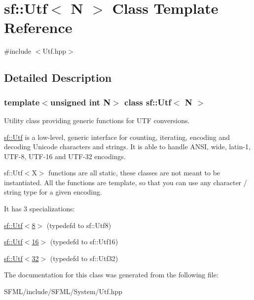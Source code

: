 \hypertarget{classsf_1_1_utf}{}\section{sf\+:\+:Utf$<$ N $>$ Class Template Reference}
\label{classsf_1_1_utf}


{\ttfamily \#include $<$Utf.\+hpp$>$}



\subsection{Detailed Description}
\subsubsection*{template$<$unsigned int N$>$\newline
class sf\+::\+Utf$<$ N $>$}

Utility class providing generic functions for U\+TF conversions.

\mbox{\hyperlink{classsf_1_1_utf}{sf\+::\+Utf}} is a low-\/level, generic interface for counting, iterating, encoding and decoding Unicode characters and strings. It is able to handle A\+N\+SI, wide, latin-\/1, U\+T\+F-\/8, U\+T\+F-\/16 and U\+T\+F-\/32 encodings.

sf\+::\+Utf$<$\+X$>$ functions are all static, these classes are not meant to be instantiated. All the functions are template, so that you can use any character / string type for a given encoding.

It has 3 specializations\+: \begin{DoxyItemize}
\item \mbox{\hyperlink{classsf_1_1_utf_3_018_01_4}{sf\+::\+Utf$<$8$>$}} (typedef\textquotesingle{}d to sf\+::\+Utf8) \item \mbox{\hyperlink{classsf_1_1_utf_3_0116_01_4}{sf\+::\+Utf$<$16$>$}} (typedef\textquotesingle{}d to sf\+::\+Utf16) \item \mbox{\hyperlink{classsf_1_1_utf_3_0132_01_4}{sf\+::\+Utf$<$32$>$}} (typedef\textquotesingle{}d to sf\+::\+Utf32) \begin{DoxyVerb}\end{DoxyVerb}
 \end{DoxyItemize}


The documentation for this class was generated from the following file\+:\begin{DoxyCompactItemize}
\item 
S\+F\+M\+L/include/\+S\+F\+M\+L/\+System/Utf.\+hpp\end{DoxyCompactItemize}
